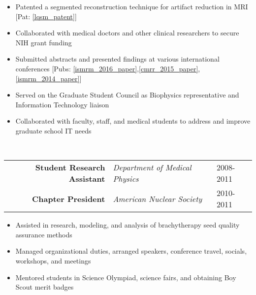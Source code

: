 \begin{minipage}{\textwidth}
	\begin{itemize}
   	\item Patented a segmented reconstruction technique for artifact reduction in MRI [Pat: \ref{lqsm_patent}]
	\item Collaborated with medical doctors and other clinical researchers to secure NIH grant funding
	\item Submitted abstracts and presented findings at various international conferences [Pubs: \ref{ismrm_2016_paper},\ref{cmrr_2015_paper},\ref{ismrm_2014_paper}]
	\item Served on the Graduate Student Council as Biophysics representative and Information Technology liaison
	\item Collaborated with faculty, staff, and medical students to address and improve graduate school IT needs
	\end{itemize}
\end{minipage}

\\

\begin{minipage}{\textwidth}
	\begin{center}
		\begin{tabular}{rll}
			\textbf{Student Research Assistant} & \textit{Department of Medical Physics} & 2008-2011 \\
			\textbf{Chapter President} & \textit{American Nuclear Society} & 2010-2011 \\
		\end{tabular}
	\end{center}
\end{minipage}%

\begin{minipage}{\textwidth}
	\begin{itemize}
		\item Assisted in research, modeling, and analysis of brachytherapy seed quality assurance methods
		\item Managed organizational duties, arranged speakers, conference travel, socials, workshops, and meetings
		\item Mentored students in Science Olympiad, science fairs, and obtaining Boy Scout merit badges
	\end{itemize}
\end{minipage}

